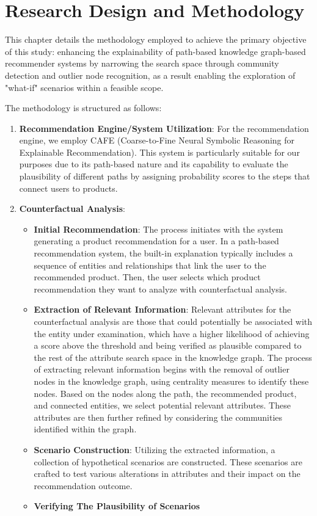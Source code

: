 \chapter{Research Design and Methodology}
\label{chap:methodology} This chapter details the methodology employed to achieve the primary objective
of this study: enhancing the explainability of path-based knowledge graph-based recommender
systems by narrowing the search space through community detection and outlier node
recognition, as a result enabling the exploration of "what-if" scenarios within
a feasible scope.

The methodology is structured as follows:
\begin{enumerate}
	\item \textbf{Recommendation Engine/System Utilization}: For the recommendation engine,
		we employ CAFE (Coarse-to-Fine Neural Symbolic Reasoning for Explainable Recommendation).
		This system is particularly suitable for our purposes due to its path-based nature
		and its capability to evaluate the plausibility of different paths by assigning
		probability scores to the steps that connect users to products.


	\item \textbf{Counterfactual Analysis}:
		\begin{itemize}
			\item \textbf{Initial Recommendation}: The process initiates with the system
			generating a product recommendation for a user. In a path-based recommendation system,
			the built-in explanation typically includes a sequence of entities and
			relationships that link the user to the recommended product. Then, the user
			selects which product recommendation they want to analyze with counterfactual
			analysis.

			\item \textbf{Extraction of Relevant Information}: Relevant attributes for the
			counterfactual analysis are those that could potentially be associated with the entity under
			examination, which have a higher likelihood of achieving a score above the threshold
			and being verified as plausible compared to the rest of the attribute search space
			in the knowledge graph. The process of extracting relevant information
			begins with the removal of outlier nodes in the knowledge graph, using
			centrality measures to identify these nodes. Based on the nodes along the path,
			the recommended product, and connected entities, we select potential relevant
			attributes. These attributes are then further refined by considering the communities
			identified within the graph. 

			\item \textbf{Scenario Construction}: Utilizing the extracted information,
				a collection of hypothetical scenarios are constructed. These scenarios are
				crafted to test various alterations in attributes and their impact on the
				recommendation outcome.
			\item \textbf{Verifying The Plausibility of Scenarios}
		\end{itemize}


\end{enumerate}
\vspace{12pt}


